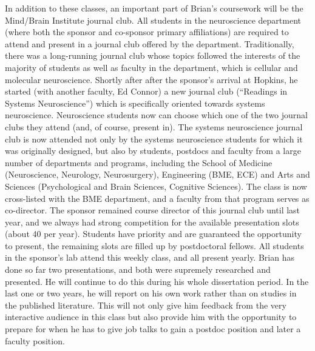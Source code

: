 \documentclass[11pt,notitlepage]{article}
\begin{document}
In addition to these classes, an important part of Brian's coursework
will be the Mind/Brain Institute journal club. All students in the
neuroscience department (where both the sponsor and co-sponsor
primary affiliations)
are required to attend 
and present in
a journal club offered
by the department. Traditionally, there was 
a
long-running
journal club whose topics followed the interests of the majority of
students as well as faculty in the 
department,
which is cellular and
molecular neuroscience. Shortly after after the sponsor's arrival at
Hopkins, he started (with another faculty, Ed Connor) a new journal
club (``Readings in Systems Neuroscience'') which is specifically
oriented towards systems neuroscience. Neuroscience students now can
choose which one of the two journal clubs they attend (and, of course,
present in). The systems neuroscience journal club is now attended not
only by the systems neuroscience students for which it was originally
designed, but also by students, postdocs and faculty from a large
number of departments and programs, 
including
 the School of Medicine
(Neuroscience, Neurology, Neurosurgery), Engineering (BME, ECE) and
Arts and Sciences (Psychological and Brain Sciences, Cognitive
Sciences). The class is now cross-listed with the BME department, and
a faculty from that program serves as co-director. The sponsor
remained course director of this journal club until last year, and we
always had strong competition for the available presentation slots
(about 40 per year). Students have priority and are guaranteed the
opportunity to present, the remaining slots are filled up
by
postdoctoral fellows. All students in the sponsor's lab attend this weekly class,
and all present yearly. Brian has done so far two presentations, and
both were supremely researched and presented. He will continue to do
this during his whole dissertation period. In the last one or two
years, he will report on his own work
rather than on studies in the published literature. This will not only
give him feedback from the very interactive audience in this class but
also provide him with the opportunity to prepare for when he has to
give job talks to gain a postdoc position and later a faculty
position.
\end{document}
